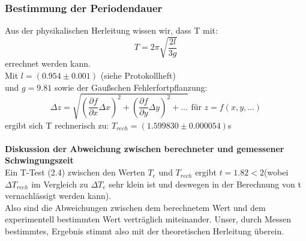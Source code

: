 \documentclass[11pt,a4paper]{article}
\begin{document}
	\subsubsection{Bestimmung der Periodendauer}
	Aus der physikalischen Herleitung wissen wir, dass T mit:
	\begin{equation}
	T=2\pi \sqrt{\frac{2l}{3g}}
	\end{equation}
	errechnet werden kann.\\
	Mit $l=(0.954\pm 0.001)$ (siehe Protokollheft) \\ und $g=9.81$ \text{[3]}
	sowie der Gaußschen Fehlerfortpflanzung:
	\begin{equation}
	\Delta z = \sqrt{(\frac{\partial f}{\partial x}\Delta x)^2 +(\frac {\partial f}{\partial y} \Delta y)^2+...} \text{   für   } z=f(x,y,...)
	\end{equation}
	ergibt sich T rechnerisch zu: $T_{rech}=(1.599830\pm0.000054)$s\\
	\\
	{\bf Diskussion der Abweichung zwischen berechneter und gemessener Schwingungszeit}\\
	Ein T-Test (2.4) zwischen den Werten $T_e$ und $T_{rech}$ ergibt $t=1.82<2$(wobei $\Delta T_{rech}$ im Vergleich zu $\Delta T_e$ sehr klein ist und deswegen in der Berechnung von t vernachlässigt werden kann).\\
	Also sind die Abweichungen zwischen dem berechnetem Wert und dem experimentell bestimmten Wert
	verträglich miteinander. Unser, durch Messen bestimmtes, Ergebnis stimmt also mit der theoretischen Herleitung überein.
\end{document}
